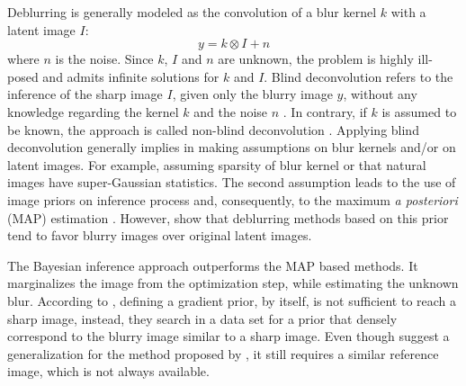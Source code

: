 \documentclass[journal]{IEEEtran}
\begin{document}
Deblurring is generally modeled as the convolution of a blur kernel $k$
with a latent image $I$: 
\begin{equation}
 y = k \otimes I + n
 \label{eq:deblurr}
\end{equation}
where $n$ is the noise. Since $k$, $I$ and $n$ are unknown, the problem 
is highly ill-posed and admits infinite solutions for $k$ and $I$.
Blind deconvolution refers to the inference of the sharp image $I$,
given only the blurry image $y$, without any knowledge regarding the
kernel $k$ and the noise $n$ \cite{Zhang2013}. In contrary, if $k$
is assumed to be known, the approach is called non-blind deconvolution
\cite{Wang2009}.
Applying blind deconvolution generally implies in making assumptions
on blur kernels and/or on latent images. For example, assuming sparsity
of blur kernel or that natural images have super-Gaussian statistics.
The second assumption leads to the use of image priors on inference process
and, consequently, to the maximum \textit{a posteriori} (MAP) estimation
\cite{Babacan2012}. However, \cite{Levin} show that deblurring methods based
on this prior tend to favor blurry images over original latent images.

The Bayesian inference approach \cite{Levin} outperforms the MAP based
methods. It marginalizes the image from the optimization step, while
estimating the unknown blur. 
According to \cite{Hacohen13}, defining a gradient prior, by itself,
is not sufficient to reach a sharp image, instead, they search in a data
set for a prior that densely correspond to the blurry image similar
to a sharp image. Even though \cite{Pan2014} suggest a generalization
for the method proposed by \cite{Hacohen13}, it still requires a similar
reference image, which is not always available.
\end{document}

